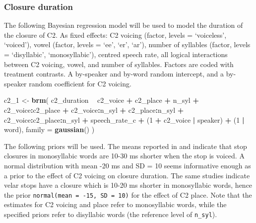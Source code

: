 \documentclass[11pt,]{article}
\newenvironment{Shaded}{\begin{snugshade}}{\end{snugshade}}
\newcommand{\KeywordTok}[1]{\textcolor[rgb]{0.13,0.29,0.53}{\textbf{#1}}}
\newcommand{\DataTypeTok}[1]{\textcolor[rgb]{0.13,0.29,0.53}{#1}}
\newcommand{\DecValTok}[1]{\textcolor[rgb]{0.00,0.00,0.81}{#1}}
\newcommand{\StringTok}[1]{\textcolor[rgb]{0.31,0.60,0.02}{#1}}
\newcommand{\OperatorTok}[1]{\textcolor[rgb]{0.81,0.36,0.00}{\textbf{#1}}}
\newcommand{\NormalTok}[1]{#1}
\begin{document}
\subsubsection{Closure duration}\label{closure-duration}

\label{s:closure}

The following Bayesian regression model will be used to model the
duration of the closure of C2. As fixed effects: C2 voicing (factor,
levels = `voiceless', `voiced'), vowel (factor, levels = `ee', `er',
`ar'), number of syllables (factor, levels = `disyllabic',
`monosyllabic'), centred speech rate, all logical interactions between
C2 voicing, vowel, and number of syllables. Factors are coded with
treatment contrasts. A by-speaker and by-word random intercept, and a
by-speaker random coefficient for C2 voicing.

\begin{Shaded}
\begin{Highlighting}[]
\NormalTok{c2_}\DecValTok{1}\NormalTok{ <-}\StringTok{ }\KeywordTok{brm}\NormalTok{(}
\NormalTok{  c2_duration }\OperatorTok{~}
\StringTok{    }\NormalTok{c2_voice }\OperatorTok{+}
\StringTok{    }\NormalTok{c2_place }\OperatorTok{+}
\StringTok{    }\NormalTok{n_syl }\OperatorTok{+}
\StringTok{    }\NormalTok{c2_voice}\OperatorTok{:}\NormalTok{c2_place }\OperatorTok{+}
\StringTok{    }\NormalTok{c2_voice}\OperatorTok{:}\NormalTok{n_syl }\OperatorTok{+}
\StringTok{    }\NormalTok{c2_place}\OperatorTok{:}\NormalTok{n_syl }\OperatorTok{+}
\StringTok{    }\NormalTok{c2_voice}\OperatorTok{:}\NormalTok{c2_place}\OperatorTok{:}\NormalTok{n_syl }\OperatorTok{+}
\StringTok{    }\NormalTok{speech_rate_c }\OperatorTok{+}
\StringTok{    }\NormalTok{(}\DecValTok{1} \OperatorTok{+}\StringTok{ }\NormalTok{c2_voice }\OperatorTok{|}\StringTok{ }\NormalTok{speaker) }\OperatorTok{+}
\StringTok{    }\NormalTok{(}\DecValTok{1} \OperatorTok{|}\StringTok{ }\NormalTok{word),}
  \DataTypeTok{family =} \KeywordTok{gaussian}\NormalTok{()}
\NormalTok{)}
\end{Highlighting}
\end{Shaded}

The following priors will be used. The means reported in
\citet{sharf1962} and \citet{luce1985} indicate that stop closures in
monosyllabic words are 10-30 ms shorter when the stop is voiced. A
normal distribution with mean -20 ms and SD = 10 seems informative
enough as a prior to the effect of C2 voicing on closure duration. The
same studies indicate velar stops have a closure which is 10-20 ms
shorter in monosyllabic words, hence the prior
\texttt{normal(mean\ =\ -15,\ SD\ =\ 10)} for the effect of C2 place.
Note that the estimates for C2 voicing and place refer to monosyllabic
words, while the specified priors refer to disyllabic words (the
reference level of \texttt{n\_syl}).
\end{document}
